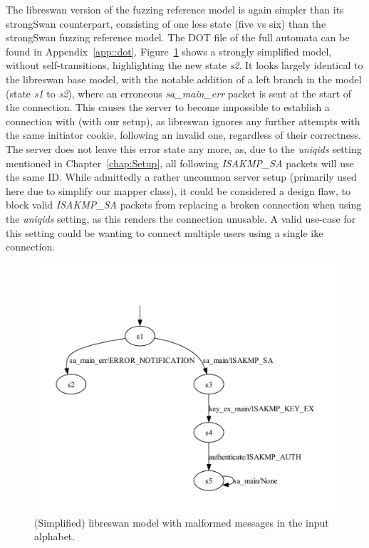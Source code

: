 The libreswan version of the fuzzing reference model is again simpler than its strongSwan counterpart, consisting of one less state (five vs six) than the strongSwan fuzzing reference model. The DOT file of the full automata can be found in Appendix~\ref{app::dot}. Figure~\ref{fig:learnedmodellibrereference} shows a strongly simplified model, without self-transitions, highlighting the new state \emph{s2}. It looks largely identical to the libreswan base model, with the notable addition of a left branch in the model (state \emph{s1} to \emph{s2}), where an erroneous \emph{sa\_main\_err} packet is sent at the start of the connection. This causes the server to become impossible to establish a connection with (with our setup), as libreswan ignores any further attempts with the same initiator cookie, following an invalid one, regardless of their correctness. The server does not leave this error state any more, as, due to the \emph{uniqids} setting mentioned in Chapter~\ref{chap:Setup}, all following \emph{ISAKMP\_SA} packets will use the same ID. While admittedly a rather uncommon server setup (primarily used here due to simplify our mapper class), it could be considered a design flaw, to block valid \emph{ISAKMP\_SA} packets from replacing a broken connection when using the \emph{uniqids} setting, as this renders the connection unusable. A valid use-case for this setting could be wanting to connect multiple users using a single \ac{ike} connection.

\begin{figure}[H]
	\centering
	\includegraphics[width=0.7\linewidth]{images/models/LearnedModelLibreReference}
	\caption{(Simplified) libreswan model with malformed messages in the input alphabet.}
	\label{fig:learnedmodellibrereference}
\end{figure}


